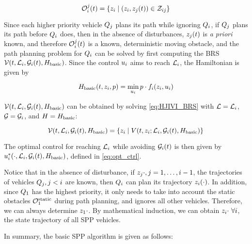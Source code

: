 \begin{equation}
\label{eq:ioset}
\ioset_i^j(t) = \{\state_i \mid (\state_i, \state_j(t)) \in \dz_{ij}\}
\end{equation}

Since each higher priority vehicle $Q_{j}$ plans its path while ignoring $Q_{i}$, if $Q_{j}$ plans its path before $Q_{i}$ does, then in the absence of disturbances, $z_j(t)$ is \textit{a priori} known, and therefore $\mathcal{O}_i^j(t)$ is a known, deterministic moving obstacle, and the path planning problem for $Q_{i}$ can be solved by first computing the BRS $\mathcal{V}(t, \mathcal{L}_i, \mathcal{G}_i(t), H_\text{basic})$. Since the control $u_i$ aims to reach $\mathcal{L}_i$, the Hamiltonian is given by

\begin{equation}
\label{eq:basicham}
\basicham(t, \state_i, p) = \min_{\ctrl_i} p \cdot \fdyn_i(\state_i, \ctrl_i)
\end{equation}

$\mathcal{V}(t, \mathcal{L}_i, \mathcal{G}_i(t), H_\text{basic})$ can be obtained by solving \eqref{eq:HJIVI_BRS} with $\mathcal{L} = \mathcal{L}_i$, $\mathcal{G} = \mathcal{G}_i$, and $H=H_\text{basic}$: 

\begin{equation}
\mathcal{V}(t, \mathcal{L}_i, \mathcal{G}_i(t), H_\text{basic}) = \{z_i \mid V(t, z_i;  \mathcal{L}_i, \mathcal{G}_i(t), H_\text{basic})\}
\end{equation}

The optimal control for reaching $\mathcal{L}_i$ while avoiding $\mathcal{G}_i(t)$ is then given by $u_i^*(\cdot, \mathcal{L}_i, \mathcal{G}_i(t), H_\text{basic})$, defined in \eqref{eq:opt_ctrl}.

Notice that in the absence of disturbance, if $z_j{\cdot}, j = 1,\ldots, i-1$, the trajectories of vehicles $Q_{j}, j<i$ are known, then $Q_{i}$ can plan its trajectory $z_i(\cdot)$. In addition, since $Q_{1}$ has the highest priority, it only needs to take into account the static obstacles $\mathcal{O}^\text{static}_1$ during path planning, and ignores all other vehicles. Therefore, we can always determine $z_1{\cdot}$. By mathematical induction, we can obtain $z_i{\cdot}~\forall i$, the state trajectory of all SPP vehicles. 

In summary, the basic SPP algorithm is given as follows:

